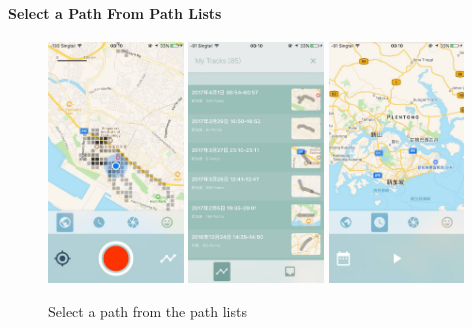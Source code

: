 \documentclass[12pt,a4paper]{article}
\begin{document}
                \paragraph{Select a Path From Path Lists}
                \begin{figure}[H]
                    \includegraphics[width=0.32\textwidth]{2-4-1-1-a}
                    \includegraphics[width=0.32\textwidth]{2-4-1-1-b}
                    \includegraphics[width=0.32\textwidth]{2-4-1-1-c}
                    \centering
                    \caption{Select a path from the path lists}
                    \label{fig:select-path-lists}
                \end{figure}
                
\end{document}

